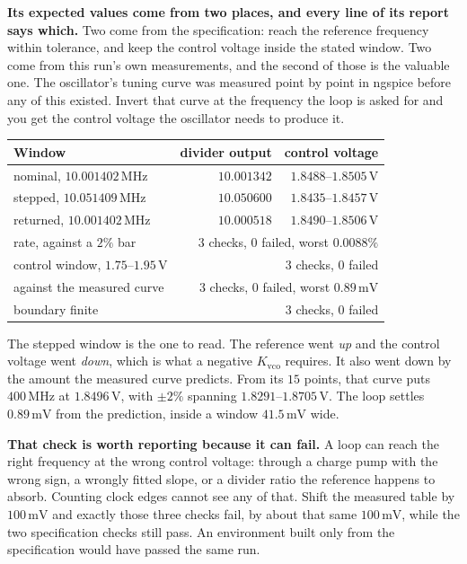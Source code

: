 \documentclass[11pt,a4paper]{article}
\newcommand{\unit}[1]{\,\textrm{#1}}
\begin{document}
\textbf{Its expected values come from two places, and every line of
its report says which.} Two come from the specification: reach the
reference frequency within tolerance, and keep the control voltage
inside the stated window. Two come from this run's own measurements,
and the second of those is the valuable one. The oscillator's tuning
curve was measured point by point in ngspice before any of this
existed. Invert that curve at the frequency the loop is asked for and
you get the control voltage the oscillator needs to produce it.

\begin{center}
\begin{tabular}{@{}lrr@{}}
\toprule
\textbf{Window} & \textbf{divider output} & \textbf{control voltage} \\
\midrule
nominal, $10.001402\unit{MHz}$  & $10.001342$ & $1.8488$--$1.8505\unit{V}$ \\
stepped, $10.051409\unit{MHz}$  & $10.050600$ & $1.8435$--$1.8457\unit{V}$ \\
returned, $10.001402\unit{MHz}$ & $10.000518$ & $1.8490$--$1.8506\unit{V}$ \\
\midrule
rate, against a $2\%$ bar        & \multicolumn{2}{r}{$3$ checks, $0$ failed, worst $0.0088\%$ \quad[SPEC]} \\
control window, $1.75$--$1.95\unit{V}$ & \multicolumn{2}{r}{$3$ checks, $0$ failed \quad[SPEC]} \\
against the measured curve       & \multicolumn{2}{r}{$3$ checks, $0$ failed, worst $0.89\unit{mV}$ \quad[MEASURED]} \\
boundary finite                  & \multicolumn{2}{r}{$3$ checks, $0$ failed \quad[MEASURED]} \\
\bottomrule
\end{tabular}
\end{center}

\noindent The stepped window is the one to read. The reference went
\emph{up} and the control voltage went \emph{down}, which is what a
negative $K_\mathrm{vco}$ requires. It also went down by the amount
the measured curve predicts. From its $15$ points, that curve puts
$400\unit{MHz}$ at $1.8496\unit{V}$, with $\pm2\%$ spanning
$1.8291$--$1.8705\unit{V}$. The loop settles $0.89\unit{mV}$ from the
prediction, inside a window $41.5\unit{mV}$ wide.

\textbf{That check is worth reporting because it can fail.} A loop can
reach the right frequency at the wrong control voltage: through a
charge pump with the wrong sign, a wrongly fitted slope, or a divider
ratio the reference happens to absorb. Counting clock edges cannot see
any of that. Shift the measured table by $100\unit{mV}$ and exactly
those three checks fail, by about that same $100\unit{mV}$, while the
two specification checks still pass. An environment built only from
the specification would have passed the same run.
\end{document}
